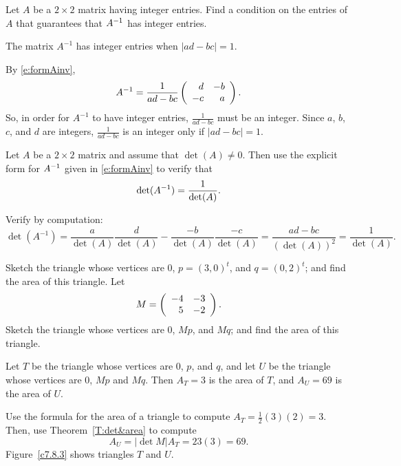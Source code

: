 \documentclass{ximera}
\begin{document}
\begin{exercise} \label{c4.9.5}
Let $A$ be a $2\times 2$ matrix having integer entries.  Find a
condition on the entries of $A$ that guarantees that $A^{-1}$ has
integer entries.

\begin{solution}

\ans The matrix $A^{-1}$ has integer entries when $|ad - bc| = 1$.

\soln By \eqref{e:formAinv},
\[
A^{-1} = \frac{1}{ad-bc}\left(\begin{array}{rr} d & -b\\ -c &a\end{array}\right).
\]
So, in order for $A^{-1}$ to have integer entries, $\frac{1}{ad-bc}$
must be an integer.  Since $a$, $b$, $c$, and $d$ are integers,
$\frac{1}{ad - bc}$ is an integer only if $|ad - bc| = 1$.


\end{solution}
\end{exercise}

\begin{exercise} \label{c6.4.4}
Let $A$ be a $2\times 2$ matrix and assume that $\det(A)\neq 0$.
Then use the explicit form for $A^{-1}$ given in \eqref{e:formAinv}
to verify that
\[
\det(A^{-1}) = \frac{1}{\det(A)}.
\]

\begin{solution}

Verify by computation:
\[ \det(A^{-1}) = \frac{a}{\det(A)}\frac{d}{\det(A)} -
\frac{-b}{\det(A)}\frac{-c}{\det(A)} = \frac{ad - bc}{(\det(A))^2} =
\frac{1}{\det(A)}. \]

\end{solution}
\end{exercise}

\begin{exercise} \label{c7.8.3}
Sketch the triangle whose vertices are $0$, $p=(3,0)^t$, and
$q=(0,2)^t$; and find the area of this triangle.  Let
\[
M=\left(\begin{array}{rr} -4 & -3\\ 5 &-2\end{array}\right).
\]
Sketch the triangle whose vertices are $0$, $Mp$, and $Mq$; and
find the area of this triangle.

\begin{solution}

\ans Let $T$ be the triangle whose vertices are $0$, $p$, and $q$, and
let $U$ be the triangle whose vertices are $0$, $Mp$ and $Mq$.  Then
$A_T = 3$ is the area of $T$, and $A_U = 69$ is the area of $U$.

\soln Use the formula for the area of a triangle to compute
$A_T = \frac{1}{2}(3)(2) = 3$.  Then, use Theorem~\ref{T:det&area} to
compute
\[
A_U = |\det{M}|A_T = 23(3) = 69.
\]
Figure~\ref{c7.8.3} shows triangles $T$ and $U$.

\begin{figure}[htb]
		\centerline{%
		}
\end{figure}

\end{solution}
\end{exercise}
\end{document}
